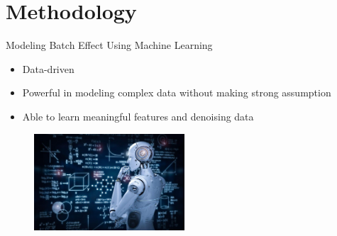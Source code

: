 \documentclass{beamer}
\begin{document}
\section{Methodology}
\begin{frame}{Modeling Batch Effect Using Machine Learning}
  \begin{itemize}
    \item Data-driven
    \item Powerful in modeling complex data without making strong assumption
    \item Able to learn meaningful features and denoising data
  \end{itemize}
  \begin{figure}[ht]
    \centering
    \includegraphics[width=0.5\textwidth]{figures/machine_learning.jpg}
    \caption*{\label{fig:ml}}
  \end{figure}

\end{frame}
\end{document}

